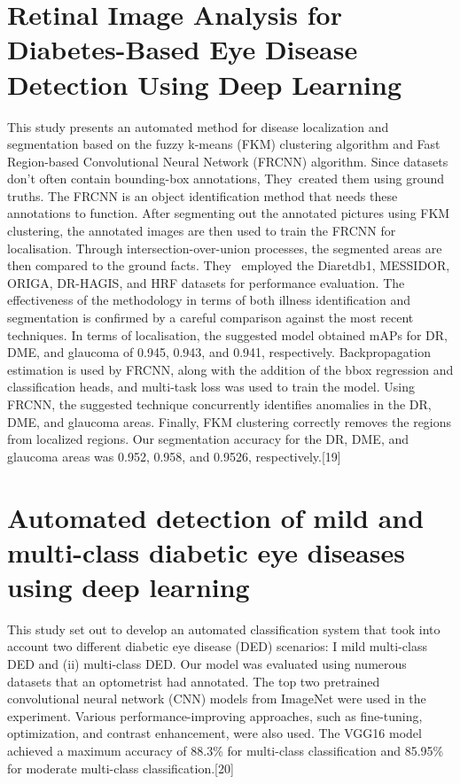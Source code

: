 \section{Retinal Image Analysis for Diabetes-Based Eye Disease Detection Using Deep Learning}
This study presents an automated method for disease localization and segmentation based on the fuzzy k-means (FKM) clustering algorithm and Fast Region-based Convolutional Neural Network (FRCNN) algorithm. Since datasets don't often contain bounding-box annotations, They created them using ground truths. The FRCNN is an object identification method that needs these annotations to function. After segmenting out the annotated pictures using FKM clustering, the annotated images are then used to train the FRCNN for localisation. Through intersection-over-union processes, the segmented areas are then compared to the ground facts. They  employed the Diaretdb1, MESSIDOR, ORIGA, DR-HAGIS, and HRF datasets for performance evaluation. The effectiveness of the methodology in terms of both illness identification and segmentation is confirmed by a careful comparison against the most recent techniques. In terms of localisation, the suggested model obtained mAPs for DR, DME, and glaucoma of 0.945, 0.943, and 0.941, respectively. Backpropagation estimation is used by FRCNN, along with the addition of the bbox regression and classification heads, and multi-task loss was used to train the model. Using FRCNN, the suggested technique concurrently identifies anomalies in the DR, DME, and glaucoma areas. Finally, FKM clustering correctly removes the regions from localized regions. Our segmentation accuracy for the DR, DME, and glaucoma areas was 0.952, 0.958, and 0.9526, respectively.[19]
\section{Automated detection of mild and multi-class diabetic eye diseases using deep learning}
This study set out to develop an automated classification system that took into account two different diabetic eye disease (DED) scenarios: I mild multi-class DED and (ii) multi-class DED. Our model was evaluated using numerous datasets that an optometrist had annotated. The top two pretrained convolutional neural network (CNN) models from ImageNet were used in the experiment. Various performance-improving approaches, such as fine-tuning, optimization, and contrast enhancement, were also used. The VGG16 model achieved a maximum accuracy of 88.3\% for multi-class classification and 85.95\% for moderate multi-class classification.[20]
